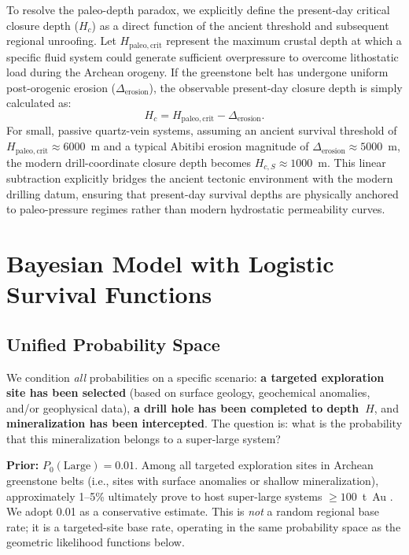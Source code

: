 \documentclass[11pt,a4paper]{article}
\begin{document}
To resolve the paleo-depth paradox, we explicitly define the present-day critical closure depth ($H_c$) as a direct function of the ancient threshold and subsequent regional unroofing.
Let $H_{\mathrm{paleo,crit}}$ represent the maximum crustal depth at which a specific fluid system could generate sufficient overpressure to overcome lithostatic load during the Archean orogeny.
If the greenstone belt has undergone uniform post-orogenic erosion ($\Delta_{\mathrm{erosion}}$), the observable present-day closure depth is simply calculated as:
\begin{equation}\label{eq:erosion}
  H_c = H_{\mathrm{paleo,crit}} - \Delta_{\mathrm{erosion}}.
\end{equation}
For small, passive quartz-vein systems, assuming an ancient survival threshold of $H_{\mathrm{paleo,crit}} \approx 6000$~m and a typical Abitibi erosion magnitude of $\Delta_{\mathrm{erosion}} \approx 5000$~m, the modern drill-coordinate closure depth becomes $H_{c,S} \approx 1000$~m.
This linear subtraction explicitly bridges the ancient tectonic environment with the modern drilling datum, ensuring that present-day survival depths are physically anchored to paleo-pressure regimes rather than modern hydrostatic permeability curves.

\section{Bayesian Model with Logistic Survival Functions}\label{sec:model}

\subsection{Unified Probability Space}

We condition \emph{all} probabilities on a specific scenario: \textbf{a targeted exploration site has been selected} (based on surface geology, geochemical anomalies, and/or geophysical data), \textbf{a drill hole has been completed to depth~$H$}, and \textbf{mineralization has been intercepted}.
The question is: what is the probability that this mineralization belongs to a super-large system?

\medskip\noindent
\textbf{Prior:} $P_0(\text{Large}) = 0.01$.
Among all targeted exploration sites in Archean greenstone belts (i.e., sites with surface anomalies or shallow mineralization), approximately 1--5\% ultimately prove to host super-large systems $\ge 100$~t~Au \cite{Goldfarb2001,Groves2003}.
We adopt 0.01 as a conservative estimate.
This is \emph{not} a random regional base rate; it is a targeted-site base rate, operating in the same probability space as the geometric likelihood functions below.
\end{document}
